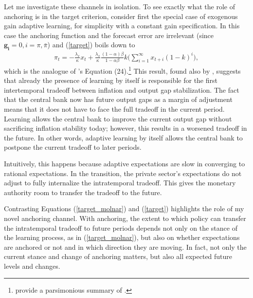 \documentclass[11pt]{article}
\renewcommand{\[}{\begin{equation}}
\renewcommand{\]}{\end{equation}}
\begin{document}
Let me investigate these channels in isolation. To see exactly what the role of anchoring is in the target criterion, consider first the special case of exogenous gain adaptive learning, for simplicity with a constant gain specification. In this case the anchoring function and the forecast error are irrelevant (since $\mathbf{g_i}=0, i=\pi,\bar{\pi}$) and (\ref{target}) boils down to
\begin{align}
\pi_t  = -\frac{\lambda_x}{\kappa}x_t + \frac{\lambda_x}{\kappa} \frac{(1-\alpha)\beta}{1-\alpha\beta} k
\bigg(\sum_{i=1}^{\infty}x_{t+i}(1-k)^i \bigg),
\label{target_molnar} %
\end{align}
which is the analogue of \cite{gaspar2010inflation}'s Equation (24).\footnote{\cite{gaspar2010inflation} provide a parsimonious summary of \cite{molnar2014optimal}.} This result, found also by \cite{molnar2014optimal}, suggests that already the presence of learning by itself is responsible for the first intertemporal tradeoff between inflation and output gap stabilization. The fact that the central bank now has future output gaps as a margin of adjustment means that it does not have to face the full tradeoff in the current period. Learning allows the central bank to improve the current output gap without sacrificing inflation stability today; however, this results in a worsened tradeoff in the future. In other words, adaptive learning by itself allows the central bank to postpone the current tradeoff to later periods. 

Intuitively, this happens because adaptive expectations are slow in converging to rational expectations. In the transition, the private sector's expectations do not adjust to fully internalize the intratemporal tradeoff. This gives the monetary authority room to transfer the tradeoff to the future.

Contrasting Equations (\ref{target_molnar}) and (\ref{target}) highlights the role of my novel anchoring channel. With anchoring, the extent to which policy can transfer the intratemporal tradeoff to future periods depends not only on the stance of the learning process, as in (\ref{target_molnar}), but also on whether expectations are anchored or not and in which direction they are moving. In fact, not only the current stance and change of anchoring matters, but also all expected future levels and changes. 
\end{document}
